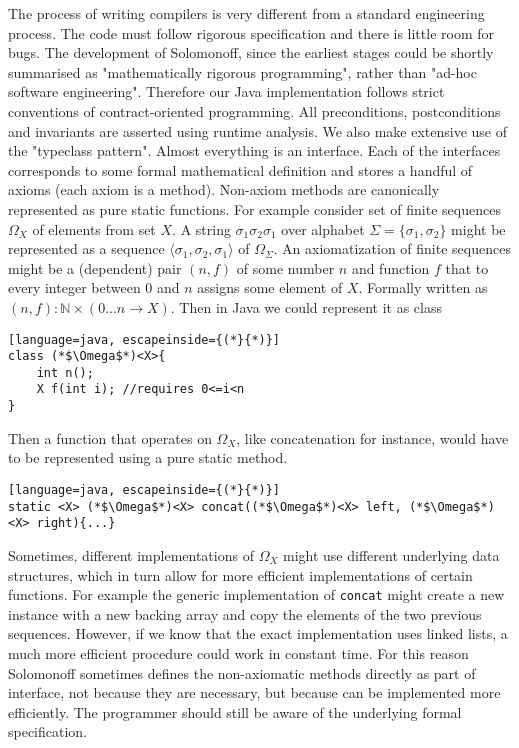 The process of writing compilers is very different from a standard engineering process. The code must follow rigorous specification and there is little room for bugs. The development of Solomonoff, since the earliest stages could be shortly summarised as "mathematically rigorous programming", rather than "ad-hoc software engineering". Therefore our Java implementation follows strict conventions of contract-oriented programming. All preconditions, postconditions and invariants are asserted using runtime analysis. We also make extensive use of the  "typeclass pattern". Almost everything is an interface. Each of the interfaces corresponds to some formal mathematical definition and stores a handful of axioms (each axiom is a method). Non-axiom methods are canonically represented as pure static functions. 
For example consider set of finite sequences $\Omega_X$ of elements from set $X$. A string $\sigma_1\sigma_2\sigma_1$ over alphabet $\Sigma=\{\sigma_1,\sigma_2\}$ might be represented as a sequence $\langle \sigma_1,\sigma_2,\sigma_1\rangle$ of $\Omega_\Sigma$. An axiomatization of finite sequences might be a (dependent) pair $(n, f)$ of some number $n$ and function $f$ that to every integer between $0$ and $n$ assigns some element of $X$. Formally written as $(n, f) : \mathbb{N} \times (0...n \rightarrow X)$. Then in Java we could represent it as class
\begin{lstlisting}[language=java, escapeinside={(*}{*)}]
class (*$\Omega$*)<X>{
    int n();
    X f(int i); //requires 0<=i<n
}
\end{lstlisting}
Then a function that operates on $\Omega_X$, like concatenation for instance, would have to be represented using a pure static method.
\begin{lstlisting}[language=java, escapeinside={(*}{*)}]
static <X> (*$\Omega$*)<X> concat((*$\Omega$*)<X> left, (*$\Omega$*)<X> right){...}
\end{lstlisting}
Sometimes, different implementations of $\Omega_X$ might use different underlying data structures, which in turn allow for more efficient implementations of certain functions. For example the generic implementation of \texttt{concat} might create a new instance with a new backing array and copy the elements of the two previous sequences. However, if we know that the exact implementation uses linked lists, a much more efficient procedure could work in constant time.  For this reason Solomonoff sometimes defines the non-axiomatic methods directly as part of interface, not because they are necessary, but because can be implemented more efficiently. The programmer should still be aware of the underlying formal specification. 

